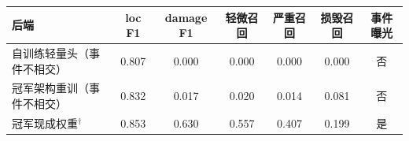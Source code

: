 \begin{tabular}{lcccccc}
\hline
后端 & loc F1 & damage F1 & 轻微召回 & 严重召回 & 损毁召回 & 事件曝光 \\
\hline
自训练轻量头（事件不相交） & 0.807 & 0.000 & 0.000 & 0.000 & 0.000 & 否 \\
冠军架构重训（事件不相交） & 0.832 & 0.017 & 0.020 & 0.014 & 0.081 & 否 \\
冠军现成权重$^\dagger$ & 0.853 & 0.630 & 0.557 & 0.407 & 0.199 & 是 \\
\hline
\end{tabular}

